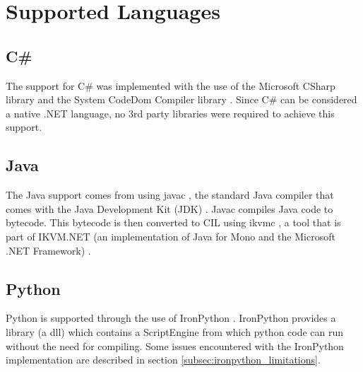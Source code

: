 \section{Supported Languages}

\subsection{C\#}
The support for C\# was implemented with the use of the Microsoft CSharp library \cite{MicrosoftCSharp} and the System CodeDom Compiler library \cite{CodeDomCompiler}. Since C\# can be considered a native .NET language, no 3rd party libraries were required to achieve this support.

\subsection{Java}
The Java support comes from using javac \cite{Javac}, the standard Java compiler that comes with the Java Development Kit (JDK) \cite{JDK}. Javac compiles Java code to bytecode. This bytecode is then converted to CIL using ikvmc \cite{IKVMC}, a tool that is part of IKVM.NET (an implementation of Java for Mono and the Microsoft .NET Framework) \cite{IKVM.NET}. 

\subsection{Python}
Python is supported through the use of IronPython \cite{IronPython}. IronPython provides a library (a dll) which contains a ScriptEngine from which python code can run without the need for compiling. Some issues encountered with the IronPython implementation are described in section \ref{subsec:ironpython_limitations}.
